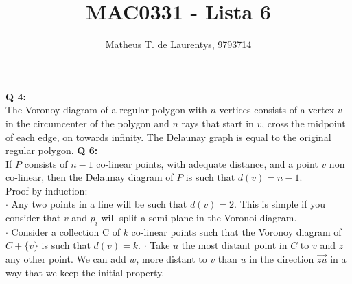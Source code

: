 \documentclass[]{article}
\title{\vspace{-4.0cm}MAC0331 - Lista 6}
\author{Matheus T. de Laurentys, 9793714}
\begin{document}
	\maketitle
	\noindent
	\textbf{Q 4:} \\
	The Voronoy diagram of a regular polygon with $n$ vertices consists of a vertex $v$ in the circumcenter of the polygon and $n$ rays that start in $v$, cross the midpoint of each edge, on towards infinity. The Delaunay graph is equal to the original regular polygon.
		\noindent
	\textbf{Q 6:} \\
	If $P$ consists of $n-1$ co-linear points, with adequate distance, and a point $v$ non co-linear, then the Delaunay diagram of $P$ is such that $d(v)=n-1$. \\
	Proof by induction: \\
	$\cdot$ Any two points in a line will be such that $d(v)=2$. This is simple if you consider that $v$ and $p_i$ will split a semi-plane in the Voronoi diagram.\\
	$\cdot$ Consider a collection C of $k$ co-linear points such that the Voronoy diagram of $C + \{v\}$ is such that $d(v) = k$.
	$\cdot$ Take $u$ the most distant point in $C$ to $v$ and $z$ any other point. We can add $w$, more distant to $v$ than $u$ in the direction $\overrightarrow{zu}$ in a way that we keep the initial property.
	
	
\end{document}
